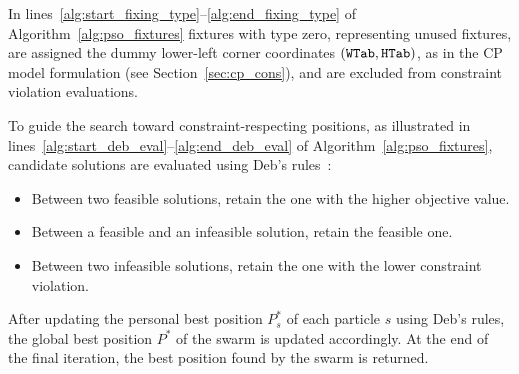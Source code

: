 In lines~\ref{alg:start_fixing_type}--\ref{alg:end_fixing_type} of Algorithm~\ref{alg:pso_fixtures}  fixtures with type zero, representing unused fixtures, are assigned the dummy lower-left corner coordinates \((\mathtt{WTab},\mathtt{HTab})\), as in the CP model formulation (see Section~\ref{sec:cp_cons}), and are excluded from constraint violation evaluations.

To guide the search toward constraint-respecting positions, as illustrated in lines~\ref{alg:start_deb_eval}--\ref{alg:end_deb_eval} of Algorithm~\ref{alg:pso_fixtures}, candidate solutions are evaluated using Deb’s rules~\cite{deb2000efficient}:
\begin{itemize}
	\item Between two feasible solutions, retain the one with the higher objective value.
	\item Between a feasible and an infeasible solution, retain the feasible one.
	\item Between two infeasible solutions, retain the one with the lower constraint violation.
\end{itemize}

After updating the personal best position $P^*_s$ of each particle $s$ using Deb’s rules, the global best position $P^*$ of the swarm is updated accordingly. At the end of the final iteration, the best position found by the swarm is returned.